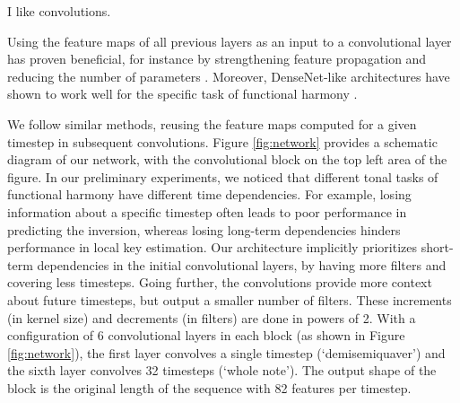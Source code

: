 

I like convolutions.

Using the feature maps of all previous layers as an input to
a convolutional layer has proven beneficial, for instance by
strengthening feature propagation and reducing the number of
parameters \parencite{huang2017densely}. Moreover, DenseNet-like
architectures have shown to work well for the specific task
of functional harmony \parencite{micchi2020not}.


We follow similar methods, reusing the feature maps computed
for a given timestep in subsequent convolutions. Figure
\ref{fig:network} provides a schematic diagram of our
network, with the convolutional block on the top left area
of the figure. In our preliminary experiments, we noticed
that different tonal tasks of functional harmony have
different time dependencies. For example, losing information
about a specific timestep often leads to poor performance in
predicting the inversion, whereas losing long-term
dependencies hinders performance in local key estimation.
Our architecture implicitly prioritizes short-term
dependencies in the initial convolutional layers, by having
more filters and covering less timesteps. Going further, the
convolutions provide more context about future timesteps,
but output a smaller number of filters. These increments (in
kernel size) and decrements (in filters) are done in powers
of 2. With a configuration of 6 convolutional layers in each
block (as shown in Figure \ref{fig:network}), the first
layer convolves a single timestep (`demisemiquaver') and the
sixth layer convolves 32 timesteps (`whole note'). The
output shape of the block is the original length of the
sequence with 82 features per timestep.
